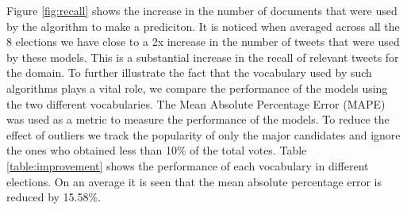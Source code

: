 Figure \ref{fig:recall} shows the increase in the number of documents that were used by the algorithm to make a prediciton.
It is noticed when averaged across all the 8 elections we have close to a 2x increase in the number of tweets that were used by these models.
This is a substantial increase in the recall of relevant tweets for the domain.
To further illustrate the fact that the vocabulary used by such algorithms plays a vital role, we compare the performance of the models using the two different vocabularies.
The Mean Absolute Percentage Error (MAPE) was used as a metric to measure the performance of the models. 
To reduce the effect of outliers we track the popularity of only the major candidates and ignore the ones who obtained less than 10\% of the total votes.
Table \ref{table:improvement} shows the performance of each vocabulary in different elections. 
On an average it is seen that the mean absolute percentage error is reduced by 15.58\%.
